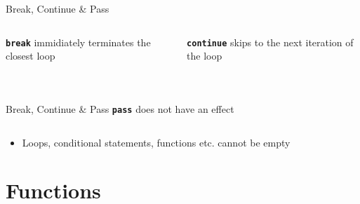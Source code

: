         \begin{frame}{Break, Continue \& Pass}
            \begin{columns}
                \begin{column}{0.5\textwidth}
                    \textbf{\texttt{break}} immidiately terminates the closest loop
                    \bigskip  
                    \inputminted[frame=single,framesep=2pt]{python3}{../Lecture3/code-examples/break1.py}
                    \pause
                    \inputminted[frame=single,framesep=2pt]{python3}{../Lecture3/code-examples/break2.py}
                \end{column}
               \pause 
                \begin{column}{0.5\textwidth}
                    \textbf{\texttt{continue}} skips to the next iteration of the loop
                    \bigskip  
                    \inputminted[frame=single,framesep=2pt]{python3}{../Lecture3/code-examples/continue1.py}
                    \pause
                    \inputminted[frame=single,framesep=2pt]{python3}{../Lecture3/code-examples/continue2.py}
                \end{column} 
            \end{columns}
        \end{frame}
        
        \begin{frame}{Break, Continue \& Pass}
            \pause
            \LARGE
            \textbf{\texttt{pass}} does not have an effect
            \bigskip  
            \inputminted[frame=single,framesep=2pt]{python3}{../Lecture3/code-examples/pass.py}
            \pause
            \begin{itemize}
                \item Loops, conditional statements, functions etc. cannot be empty 
            \end{itemize}
        \end{frame}


    \section{Functions}
